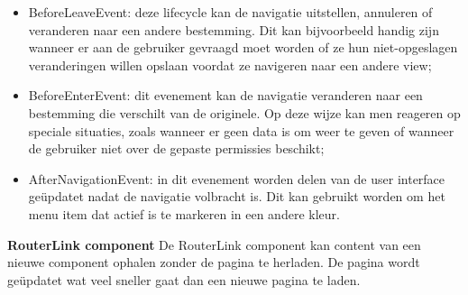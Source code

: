 \begin{itemize}
	\item BeforeLeaveEvent: deze lifecycle kan de navigatie uitstellen, annuleren of veranderen naar een andere bestemming. Dit kan bijvoorbeeld handig zijn wanneer er aan de gebruiker gevraagd moet worden of ze hun niet-opgeslagen veranderingen willen opslaan voordat ze navigeren naar een andere view; 
	\item BeforeEnterEvent: dit evenement kan de navigatie veranderen naar een bestemming die verschilt van de originele. Op deze wijze kan men reageren op speciale situaties, zoals wanneer er geen data is om weer te geven of wanneer de gebruiker niet over de gepaste permissies beschikt;
	\item AfterNavigationEvent: in dit evenement worden delen van de user interface geüpdatet nadat de navigatie volbracht is. Dit kan gebruikt worden om het menu item dat actief is te markeren in een andere kleur.
\end{itemize}

\textbf{RouterLink component} \hspace{1cm} De RouterLink component kan content van een nieuwe component ophalen zonder de pagina te herladen. De pagina wordt geüpdatet wat veel sneller gaat dan een nieuwe pagina te laden. 

